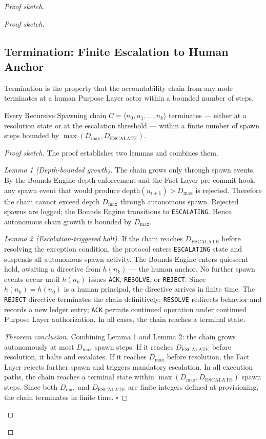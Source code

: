 \begin{proof}[Proof sketch]
\begin{proof}[Proof sketch]
\subsection{Termination: Finite Escalation to Human Anchor}
\label{sec:rs-termination}

Termination is the property that the accountability chain from any node terminates at a human Purpose Layer actor within a bounded number of steps.

\begin{thrm}[Termination]
\label{thrm:termination}
Every Recursive Spawning chain $C = \langle n_0, n_1, \ldots, n_k \rangle$ terminates — either at a resolution state or at the escalation threshold — within a finite number of spawn steps bounded by $\max(D_{\mathrm{max}}, D_{\mathrm{ESCALATE}})$.
\end{thrm}

\begin{proof}[Proof sketch]
The proof establishes two lemmas and combines them.

\medskip
\textit{Lemma 1 (Depth-bounded growth).} The chain grows only through spawn events. By the Bounds Engine depth enforcement and the Fact Layer pre-commit hook, any spawn event that would produce $\mathrm{depth}(n_{i+1}) > D_{\mathrm{max}}$ is rejected. Therefore the chain cannot exceed depth $D_{\mathrm{max}}$ through autonomous spawn. Rejected spawns are logged; the Bounds Engine transitions to \texttt{ESCALATING}. Hence autonomous chain growth is bounded by $D_{\mathrm{max}}$.

\medskip
\textit{Lemma 2 (Escalation-triggered halt).} If the chain reaches $D_{\mathrm{ESCALATE}}$ before resolving the exception condition, the protocol enters \texttt{ESCALATING} state and suspends all autonomous spawn activity. The Bounds Engine enters quiescent hold, awaiting a directive from $h(n_k)$ — the human anchor. No further spawn events occur until $h(n_k)$ issues \texttt{ACK}, \texttt{RESOLVE}, or \texttt{REJECT}. Since $h(n_k) = h(n_0)$ is a human principal, the directive arrives in finite time. The \texttt{REJECT} directive terminates the chain definitively; \texttt{RESOLVE} redirects behavior and records a new ledger entry; \texttt{ACK} permits continued operation under continued Purpose Layer authorization. In all cases, the chain reaches a terminal state.

\medskip
\textit{Theorem conclusion.} Combining Lemma 1 and Lemma 2: the chain grows autonomously at most $D_{\mathrm{max}}$ spawn steps. If it reaches $D_{\mathrm{ESCALATE}}$ before resolution, it halts and escalates. If it reaches $D_{\mathrm{max}}$ before resolution, the Fact Layer rejects further spawn and triggers mandatory escalation. In all execution paths, the chain reaches a terminal state within $\max(D_{\mathrm{max}}, D_{\mathrm{ESCALATE}})$ spawn steps. Since both $D_{\mathrm{max}}$ and $D_{\mathrm{ESCALATE}}$ are finite integers defined at provisioning, the chain terminates in finite time. $\square$
\endproof


\end{proof}
\end{proof}
\end{proof}
